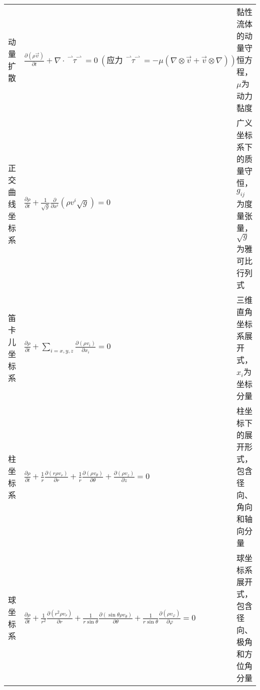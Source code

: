 \documentclass[12pt, a4paper, oneside, UTF8]{ctexbook}  %
\newcommand{\vvec}{\overset{\rightharpoonup\!\!\!\! \rightharpoonup}}
\begin{document}
\begin{table}[h!t]
\begin{tabularx}{\textwidth}{ 
        >{\hsize=0.5\hsize\raggedright\arraybackslash}X 
        >{\hsize=1.6\hsize\raggedright\arraybackslash}X 
        >{\hsize=0.9\hsize\RaggedRight\arraybackslash}X 
    }
    动量扩散 & 
    $\displaystyle \frac{\partial (\rho \vec{v})}{\partial t} + \nabla \cdot \vvec{\tau} = 0\ (\text{应力}\ \vvec{\tau} = -\mu (\nabla \otimes \vec{v} + \vec{v} \otimes \nabla))$ & 
    黏性流体的动量守恒方程，$\mu$为动力黏度 \\[8pt]
    
    正交曲线坐标系 & 
    $\displaystyle \frac{\partial \rho}{\partial t} + \frac{1}{\sqrt{g}}\frac{\partial}{\partial x^i}(\rho v^i \sqrt{g}) = 0$ & 
    广义坐标系下的质量守恒，$g_{ij}$为度量张量，$\sqrt{g}$为雅可比行列式 \\[8pt]
    
    笛卡儿坐标系 & 
    $\displaystyle \frac{\partial \rho}{\partial t} + \sum_{i=x,y,z} \frac{\partial (\rho v_i)}{\partial x_i} = 0$ & 
    三维直角坐标系展开式，$x_i$为坐标分量 \\[8pt]
    
    柱坐标系 & 
    $\displaystyle \frac{\partial \rho}{\partial t} + \frac{1}{r}\frac{\partial (r\rho v_r)}{\partial r} + \frac{1}{r}\frac{\partial (\rho v_\theta)}{\partial \theta} + \frac{\partial (\rho v_z)}{\partial z} = 0$ & 
    柱坐标下的展开形式，包含径向、角向和轴向分量 \\[8pt]
    
    球坐标系 & 
    $\displaystyle \frac{\partial \rho}{\partial t} + \frac{1}{r^2}\frac{\partial (r^2\rho v_r)}{\partial r} + \frac{1}{r\sin\theta}\frac{\partial (\sin\theta \rho v_\theta)}{\partial \theta} + \frac{1}{r\sin\theta}\frac{\partial (\rho v_\varphi)}{\partial \varphi} = 0$ & 
    球坐标系展开式，包含径向、极角和方位角分量 \\
    \bottomrule
    \end{tabularx}
\end{table}
\end{document}
